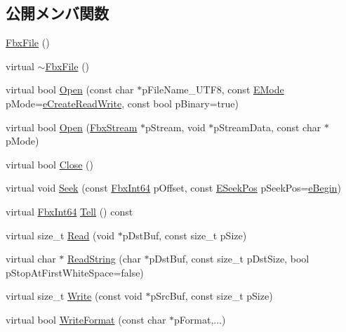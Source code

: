 \subsection*{公開メンバ関数}
\begin{DoxyCompactItemize}
\item 
\hyperlink{class_fbx_file_a863a523033dcdf07ad32c257c64d9e61}{Fbx\+File} ()
\item 
virtual \hyperlink{class_fbx_file_a2dd86a0057e7caa4865a92508cc9b56d}{$\sim$\+Fbx\+File} ()
\item 
virtual bool \hyperlink{class_fbx_file_a1942c2245eabf7f0507118226af13727}{Open} (const char $\ast$p\+File\+Name\+\_\+\+U\+T\+F8, const \hyperlink{class_fbx_file_a0370e8fd17b3658f718e1350a6a6f462}{E\+Mode} p\+Mode=\hyperlink{class_fbx_file_a0370e8fd17b3658f718e1350a6a6f462afce41267d2567926e7983b1193991a49}{e\+Create\+Read\+Write}, const bool p\+Binary=true)
\item 
virtual bool \hyperlink{class_fbx_file_a32456c88ed5a970971facea637ba96b1}{Open} (\hyperlink{class_fbx_stream}{Fbx\+Stream} $\ast$p\+Stream, void $\ast$p\+Stream\+Data, const char $\ast$p\+Mode)
\item 
virtual bool \hyperlink{class_fbx_file_ae8028a6bb80f3ebe4f6fcbaab367228b}{Close} ()
\item 
virtual void \hyperlink{class_fbx_file_af12434c7b2bf0cd193d3327180186901}{Seek} (const \hyperlink{fbxtypes_8h_ac7e1334c7c6aacc9c8a9dccddebb4368}{Fbx\+Int64} p\+Offset, const \hyperlink{class_fbx_file_aba91fe59f9c0a4c84a92f13c0c27deec}{E\+Seek\+Pos} p\+Seek\+Pos=\hyperlink{class_fbx_file_aba91fe59f9c0a4c84a92f13c0c27deeca7a474ae0aa6f46b8becdfe54208f928e}{e\+Begin})
\item 
virtual \hyperlink{fbxtypes_8h_ac7e1334c7c6aacc9c8a9dccddebb4368}{Fbx\+Int64} \hyperlink{class_fbx_file_aa32606ad8b5a8163f04c38b3020ec826}{Tell} () const
\item 
virtual size\+\_\+t \hyperlink{class_fbx_file_a9d2eb8ec7b9a877dd7aa9b2950287285}{Read} (void $\ast$p\+Dst\+Buf, const size\+\_\+t p\+Size)
\item 
virtual char $\ast$ \hyperlink{class_fbx_file_aad1b9e2c0f770ebfac6d00ebfc0927dd}{Read\+String} (char $\ast$p\+Dst\+Buf, const size\+\_\+t p\+Dst\+Size, bool p\+Stop\+At\+First\+White\+Space=false)
\item 
virtual size\+\_\+t \hyperlink{class_fbx_file_a8fff74d83402e939b69ac4c25a5bc689}{Write} (const void $\ast$p\+Src\+Buf, const size\+\_\+t p\+Size)
\item 
virtual bool \hyperlink{class_fbx_file_a64271cf33bdcd55d35502cd46ab910a5}{Write\+Format} (const char $\ast$p\+Format,...)

\end{DoxyCompactItemize}

